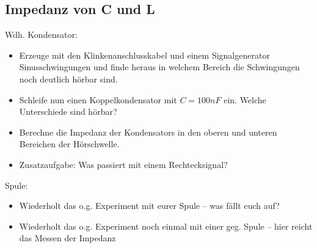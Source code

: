 
\subsection*{Impedanz von C und L}

Wdh. Kondensator:

\begin{itemize}
    \item Erzeuge mit den Klinkenanschlusskabel und einem Signalgenerator
      Sinusschwingungen und finde heraus in welchem Bereich die Schwingungen
      noch deutlich hörbar sind.
    \item Schleife nun einen Koppelkondensator mit $C = 100 nF$ ein. Welche Unterschiede
      sind hörbar? 
    \item Berechne die Impedanz der Kondensators in den oberen und unteren
      Bereichen der Hörschwelle.
    \item Zusatzaufgabe: Was passiert mit einem Rechtecksignal?
\end{itemize}


Spule:

\begin{itemize}
  \item Wiederholt das o.g. Experiment mit eurer Spule -- was fällt euch auf?
  \item Wiederholt das o.g. Experiment noch einmal mit einer geg. Spule -- hier
    reicht das Messen der Impedanz %
\end{itemize}



